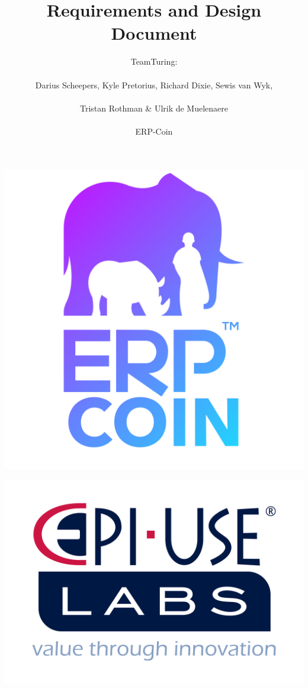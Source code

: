\documentclass{article}
\title{Requirements and Design Document}
\author{TeamTuring:\\\\Darius Scheepers, Kyle Pretorius, Richard Dixie, Sewis van Wyk,\\\\ Tristan Rothman \& Ulrik de Muelenaere\\\\ ERP-Coin}
\date{}
\begin{document}
\maketitle
\begin{center}
\includegraphics[scale=0.1]{erp-logo.png}
\end{center}

\begin{center}
\includegraphics[scale=0.15]{epi-use.png}
\end{center}
\end{document}
